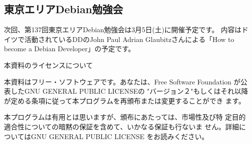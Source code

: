 \documentclass[mingoth,a4paper]{jsarticle}
\begin{document}
\subsection{東京エリアDebian勉強会}
次回、第137回東京エリアDebian勉強会は3月5日(土)に開催予定です。
内容はドイツで活動されているDDのJohn Paul Adrian Glaubitzさんによる「How to
become a Debian Developer」の予定です。

%
\mbox{}\newpage
\mbox{}\newpage

\pagebreak

\begin{center}
本資料のライセンスについて
\end{center}

本資料はフリー・ソフトウェアです。あなたは、Free Software
Foundation が公表したGNU GENERAL PUBLIC LICENSEの "バージョン２"もしくはそれ以降
が定める条項に従って本プログラムを再頒布または変更することができ
ます。

本プログラムは有用とは思いますが、頒布にあたっては、市場性及び特
定目的適合性についての暗黙の保証を含めて、いかなる保証も行ないま
せん。詳細についてはGNU GENERAL PUBLIC LICENSE をお読みください。
\end{document}
